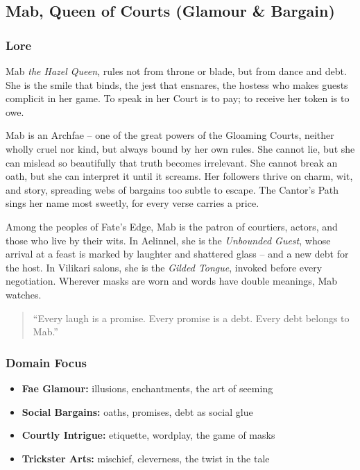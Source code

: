 
\subsection{Mab, Queen of Courts (Glamour \& Bargain)}

\subsubsection*{Lore}
Mab \textit{the Hazel Queen}, rules not from throne or blade, but from dance and debt. She is the smile that binds, the jest that ensnares, the hostess who makes guests complicit in her game. To speak in her Court is to pay; to receive her token is to owe.

Mab is an Archfae -- one of the great powers of the Gloaming Courts, neither wholly cruel nor kind, but always bound by her own rules. She cannot lie, but she can mislead so beautifully that truth becomes irrelevant. She cannot break an oath, but she can interpret it until it screams. Her followers thrive on charm, wit, and story, spreading webs of bargains too subtle to escape. The Cantor's Path sings her name most sweetly, for every verse carries a price.

Among the peoples of Fate's Edge, Mab is the patron of courtiers, actors, and those who live by their wits. In Aelinnel, she is the \textit{Unbounded Guest}, whose arrival at a feast is marked by laughter and shattered glass -- and a new debt for the host. In Vilikari salons, she is the \textit{Gilded Tongue}, invoked before every negotiation. Wherever masks are worn and words have double meanings, Mab watches.

\begin{quote}
``Every laugh is a promise. Every promise is a debt. Every debt belongs to Mab.''
\end{quote}

\subsubsection*{Domain Focus}
\begin{itemize}
  \item \textbf{Fae Glamour:} illusions, enchantments, the art of seeming
  \item \textbf{Social Bargains:} oaths, promises, debt as social glue
  \item \textbf{Courtly Intrigue:} etiquette, wordplay, the game of masks
  \item \textbf{Trickster Arts:} mischief, cleverness, the twist in the tale
\end{itemize}

